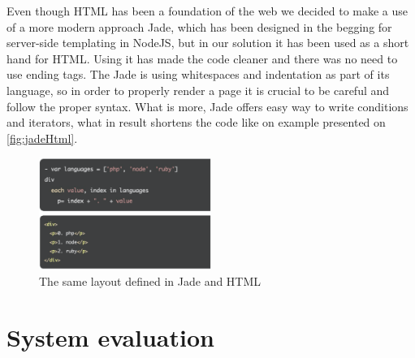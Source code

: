 Even though HTML has been a foundation of the web we decided to make a use of a more modern approach Jade, which has been designed in the begging for server-side templating in NodeJS, but in our solution it has been used as a short hand for HTML. Using it has made the code cleaner and there was no need to use ending tags. The Jade is using whitespaces and indentation as part of its language, so in order to properly render a page it is crucial to be careful and follow the proper syntax. What is more, Jade offers easy way to write conditions and iterators, what in result shortens the code like on example presented on \autoref{fig:jadeHtml}.

\begin{figure}[ht!]
\caption{The same layout defined in Jade and HTML}
\label{fig:jadeHtml}
\centering
\includegraphics[width=0.5\textwidth]{img/htmlJade}
\end{figure}

\section{System evaluation}

